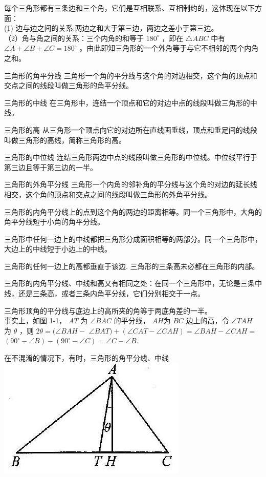 \documentclass[10pt]{article}
\begin{document}
每个三角形都有三条边和三个角，它们是互相联系、互相制约的，这体现在以下方面：\\
(1) 边与边之间的关系:两边之和大于第三边，两边之差小于第三边。\\
（2）角与角之间的关系：三个内角的和等于 $180^{\circ}$ ，即在 $\triangle A B C$ 中有 $\angle A+\angle B+\angle C=180^{\circ}$ 。由此即知三角形的一个外角等于与它不相邻的两个内角之和。

三角形的角平分线 三角形一个角的平分线与这个角的对边相交，这个角的顶点和交点之间的线段叫做三角形的角平分线。

三角形的中线 在三角形中，连结一个顶点和它的对边中点的线段叫做三角形的中线。

三角形的高 从三角形一个顶点向它的对边所在直线画垂线，顶点和垂足间的线段叫做三角形的高线，简称三角形的高。

三角形的中位线 连结三角形两边中点的线段叫做三角形的中位线。中位线平行于第三边且等于第三边的一半。

三角形的外角平分线 三角形一个内角的邻补角的平分线与这个角的对边的延长线相交，这个角的顶点和交点之间的线段叫做三角形的外角平分线。

三角形的内角平分线上的点到这个角的两边的距离相等。同一个三角形中，大角的角平分线短于小角的角平分线。

三角形中任何一边上的中线都把三角形分成面积相等的两部分。同一个三角形中，大边上的中线短于小边上的中线。

三角形的任何一边上的高都垂直于该边. 三角形的三条高未必都在三角形的内部。

三角形的内角平分线、中线和高又有相同之处：在同一个三角形中，无论是三条中线，还是三条高，或者三条内角平分线，它们分别相交于一点。

三角形顶角的平分线与底边上的高所夹的角等于两底角差的一半。\\
事实上，如图 1-1， $A T$ 为 $\angle B A C$ 的平分线， $A H$为 $B C$ 边上的高，令 $\angle T A H$ 为 $\theta$ ，则 $2 \theta=(\angle B A H-$ $\angle B A T)+(\angle C A T-\angle C A H)=\angle B A H-\angle C A H=$ $\left(90^{\circ}-\angle B\right)-\left(90^{\circ}-\angle C\right)=\angle C-\angle B$.

在不混淆的情况下，有时，三角形的角平分线、中线\\
\includegraphics[max width=\textwidth, center]{2024_10_30_2c8f45efd4a519b08e1ag-008}
\end{document}
